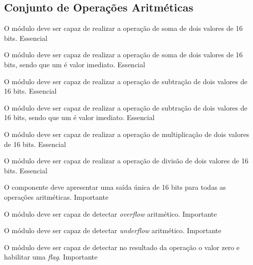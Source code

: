 \subsection{Conjunto de Operações Aritméticas} 
  
    \begin{functional}
      {O módulo deve ser capaz de realizar a operação de soma de dois valores de 16 bits.}
      {Essencial}
      
      {O módulo deve ser capaz de realizar a operação de soma de dois valores de 16 bits, sendo que um é valor imediato.}
      {Essencial}

      {O módulo deve ser capaz de realizar a operação de subtração de dois valores de 16 bits.}
      {Essencial}
      
      {O módulo deve ser capaz de realizar a operação de subtração de dois valores de 16 bits, sendo que um é valor imediato.}
      {Essencial}

      {O módulo deve ser capaz de realizar a operação de multiplicação de dois valores de 16 bits. }
      {Essencial}

      {O módulo deve ser capaz de realizar a operação de divisão de dois valores de 16 bits.}
      {Essencial} 
     

      {O componente deve apresentar uma saída única de 16 bits para todas as operações aritméticas.}
      {Importante}       

      {O módulo deve ser capaz de detectar \textit{overflow} aritmético.}
      {Importante}
      
      {O módulo deve ser capaz de detectar \textit{underflow} aritmético.}
      {Importante}
      
      {O módulo deve ser capaz de detectar no resultado da operação o valor zero e habilitar uma \textit{flag}.}
      {Importante}
      
    \end{functional}